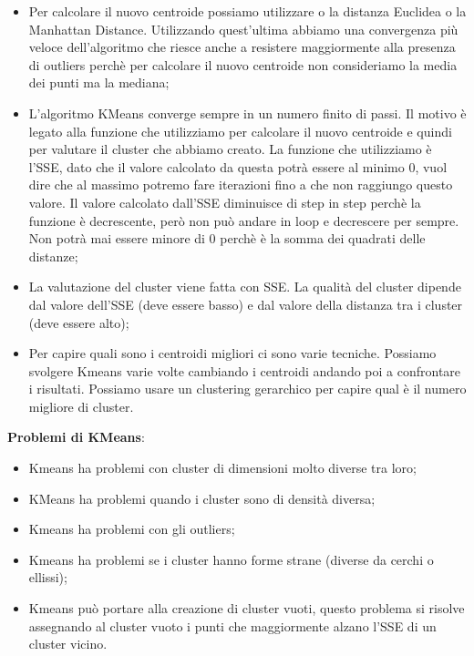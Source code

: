 \documentclass[14pt]{extreport}
\begin{document}
\begin{itemize}
    \item Per calcolare il nuovo centroide possiamo utilizzare o la distanza Euclidea o la Manhattan Distance. Utilizzando quest'ultima abbiamo una convergenza più veloce dell'algoritmo che riesce anche a resistere maggiormente alla presenza di outliers perchè per calcolare il nuovo centroide non consideriamo la media dei punti ma la mediana;
    \item L'algoritmo KMeans converge sempre in un numero finito di passi. Il motivo è legato alla funzione che utilizziamo per calcolare il nuovo centroide e quindi per valutare il cluster che abbiamo creato.
    La funzione che utilizziamo è l'SSE, dato che il valore calcolato da questa potrà essere al minimo 0, vuol dire che al massimo potremo fare iterazioni fino a che non raggiungo questo valore.
    Il valore calcolato dall'SSE diminuisce di step in step perchè la funzione è decrescente, però non può andare in loop e decrescere per sempre.
    Non potrà mai essere minore di 0 perchè è la somma dei quadrati delle distanze;
    \item La valutazione del cluster viene fatta con SSE. La qualità del cluster dipende dal valore dell'SSE (deve essere basso) e dal valore della distanza tra i cluster (deve essere alto);
    \item Per capire quali sono i centroidi migliori ci sono varie tecniche. Possiamo svolgere Kmeans varie volte cambiando i centroidi andando poi a confrontare i risultati. Possiamo usare un clustering gerarchico per capire qual è il numero migliore di cluster.
\end{itemize}

{\bf Problemi di KMeans}:

\begin{itemize}
    \item Kmeans ha problemi con cluster di dimensioni molto diverse tra loro;
    \item KMeans ha problemi quando i cluster sono di densità diversa;
    \item Kmeans ha problemi con gli outliers;
    \item Kmeans ha problemi se i cluster hanno forme strane (diverse da cerchi o ellissi);
    \item Kmeans può portare alla creazione di cluster vuoti, questo problema si risolve assegnando al cluster vuoto i punti che maggiormente alzano l'SSE di un cluster vicino.
\end{itemize}
\end{document}
